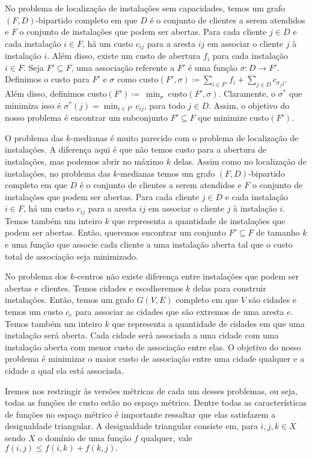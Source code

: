 \documentclass[12pt]{article}
\begin{document}
No problema de localização de instalações sem capacidades, temos um grafo $(F,D)$-bipartido completo em que $D$ é o conjunto de clientes a serem atendidos e $F$ o conjunto de instalações que podem ser abertas. Para cada cliente $j \in D$ e cada instalação $i \in F$, há um custo $c_{ij}$ para a aresta $ij$ em associar o cliente $j$ à instalação $i$. Além disso, existe um custo de abertura $f_i$ para cada instalação $i \in F$. Seja $F' \subseteq F$, uma associação referente a $F'$ é uma função $\sigma : D \to F'$. Definimos o custo para $F'$ e $\sigma$ como $\text{custo}(F',\sigma)\coloneqq \sum_{ i \in F'} f_i + \sum_{j \in D} c_{\sigma_{j}j}$. Além disso, definimos custo$(F') \coloneqq~\min_{\sigma}~\text{custo}(F',\sigma)$. Claramente, o $\sigma^*$ que minimiza isso é $\sigma^*(j) = \min_{i \in F'} c_{ij}$, para todo $j \in D$. Assim, o objetivo do nosso problema é encontrar um subconjunto $F' \subseteq F$ que minimize custo$(F')$.

O problema das $k$-medianas é muito parecido com o problema de localização de instalações. A diferença aqui é que não temos custo para a abertura de instalações, mas podemos abrir no máximo $k$ delas. 
Assim como no localização de instalações, no problema das $k$-medianas temos um grafo $(F,D)$-bipartido completo em que $D$ é o conjunto de clientes a serem atendidos e $F$ o conjunto de instalações que podem ser abertas. Para cada cliente $j \in D$ e cada instalação $i \in F$, há um custo $c_{ij}$ para a aresta $ij$ em associar o cliente $j$ à instalação $i$. Temos também um inteiro $k$ que representa a quantidade de instalações que podem ser abertas. Então, queremos encontrar um conjunto $F' \subseteq F$ de tamanho $k$ e uma função que associe cada cliente a uma instalação aberta tal que o custo total de associação seja minimizado.

No problema dos $k$-centros não existe diferença entre instalações que podem ser abertas e clientes. Temos cidades e escolheremos $k$ delas para construir instalações.
Então, temos um grafo $G(V,E)$ completo em que $V$ são cidades e temos um custo $c_{e}$ para associar as cidades que são extremos de uma aresta $e$. Temos também um inteiro $k$ que representa a quantidade de cidades em que uma instalação será aberta. Cada cidade será associada a uma cidade com uma instalação aberta com menor custo de associação entre elas. O objetivo do nosso problema é minimizar o maior custo de associação entre uma cidade qualquer e a cidade a qual ela está associada.

Iremos nos restringir às versões métricas de cada um desses problemas, ou seja, todas as funções de custo estão no espaço métrico. Dentre todas as características de funções no espaço métrico é importante ressaltar que elas satisfazem a desigualdade triangular. A desigualdade triangular consiste em, para $i,j,k \in X$ sendo $X$ o domínio de uma função $f$ qualquer, vale \( f(i,j) \leq f(i,k) + f(k,j).\)
\end{document}
